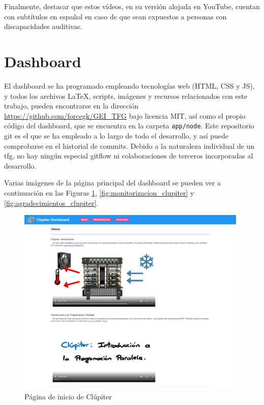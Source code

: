 Finalmente, destacar que estos vídeos, en su versión alojada en YouTube, cuentan con subtítulos en español en caso de que sean expuestos a personas con discapacidades auditivas.

\section{Dashboard}
El dashboard se ha programado empleando tecnologías web (HTML, CSS y JS), y todos los archivos \LaTeX, scripts, imágenes y recursos relacionados con este trabajo, pueden encontrarse en la dirección \url{https://github.com/forcegk/GEI_TFG} bajo licencia MIT, así como el propio código del dashboard, que se encuentra en la carpeta \texttt{app/node}. Este repositorio git es el que se ha empleado a lo largo de todo el desarrollo, y así puede comprobarse en el historial de commits. Debido a la naturaleza individual de un \acrshort{tfg}, no hay ningún especial gitflow ni colaboraciones de terceros incorporadas al desarrollo.

Varias imágenes de la página principal del dashboard se pueden ver a continuación en las Figuras \ref{fig:inicio_clupiter}, \ref{fig:monitorizacion_clupiter} y \ref{fig:agradecimientos_clupiter}.

\begin{figure}[h!]
  \centering
  \vspace{0.20cm}
  \includegraphics[width=0.98\textwidth]{img/dashboard/inicio.png}
  \caption{Página de inicio de Clúpiter}
  \label{fig:inicio_clupiter}
\end{figure}


